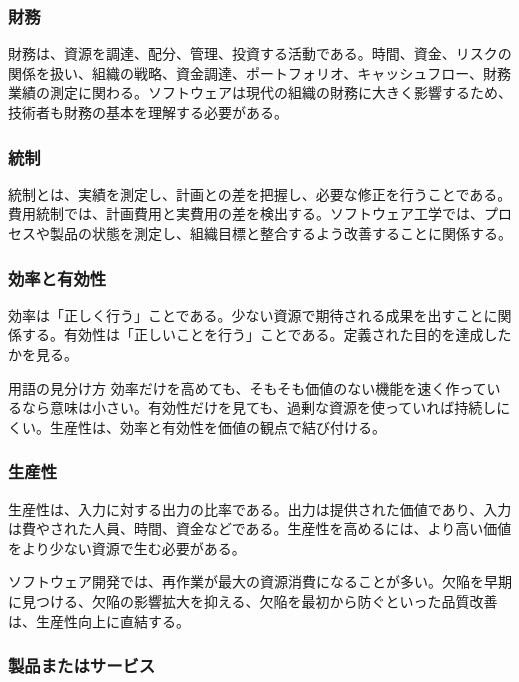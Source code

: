 \documentclass[a4paper,11pt]{ltjsarticle}
\numberwithin{figure}{section}
\numberwithin{table}{section}
\begin{document}
\subsubsection{財務}

財務は、資源を調達、配分、管理、投資する活動である。時間、資金、リスクの関係を扱い、組織の戦略、資金調達、ポートフォリオ、キャッシュフロー、財務業績の測定に関わる。ソフトウェアは現代の組織の財務に大きく影響するため、技術者も財務の基本を理解する必要がある。

\subsubsection{統制}

統制とは、実績を測定し、計画との差を把握し、必要な修正を行うことである。費用統制では、計画費用と実費用の差を検出する。ソフトウェア工学では、プロセスや製品の状態を測定し、組織目標と整合するよう改善することに関係する。

\subsubsection{効率と有効性}

効率は「正しく行う」ことである。少ない資源で期待される成果を出すことに関係する。有効性は「正しいことを行う」ことである。定義された目的を達成したかを見る。

\begin{notebox}{用語の見分け方}
効率だけを高めても、そもそも価値のない機能を速く作っているなら意味は小さい。有効性だけを見ても、過剰な資源を使っていれば持続しにくい。生産性は、効率と有効性を価値の観点で結び付ける。
\end{notebox}

\subsubsection{生産性}

生産性は、入力に対する出力の比率である。出力は提供された価値であり、入力は費やされた人員、時間、資金などである。生産性を高めるには、より高い価値をより少ない資源で生む必要がある。

ソフトウェア開発では、再作業が最大の資源消費になることが多い。欠陥を早期に見つける、欠陥の影響拡大を抑える、欠陥を最初から防ぐといった品質改善は、生産性向上に直結する。

\subsubsection{製品またはサービス}
\end{document}
